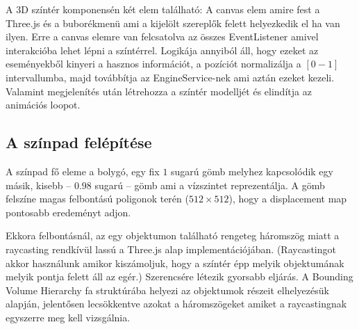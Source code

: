 A 3D színtér komponensén két elem található: A canvas elem amire fest a Three.js és a buborékmenü ami a kijelölt szereplők felett helyezkedik el ha van ilyen. Erre a canvas elemre van felcsatolva az összes EventListener amivel interakcióba lehet lépni a színtérrel. Logikája annyiból áll, hogy ezeket az eseményekből kinyeri a hasznos információt, a pozíciót normalizálja a $[0-1]$ intervallumba, majd továbbítja az EngineService-nek ami aztán ezeket kezeli. Valamint megjelenítés után létrehozza a színtér modelljét és elindítja az animációs loopot.

\subsection{A színpad felépítése}

A színpad fő eleme a bolygó, egy fix $1$ sugarú gömb melyhez kapcsolódik egy másik, kisebb -- $0.98$ sugarú -- gömb ami a vízszintet reprezentálja. A gömb felszíne magas felbontású poligonok terén ($512×512$), hogy a displacement map \cite{Displacement} pontosabb eredeményt adjon.

Ekkora felbontásnál, az egy objektumon található rengeteg háromszög miatt a raycasting \cite{Raycast} rendkívül lassú a Three.js alap implementációjában. (Raycastingot akkor használunk amikor kiszámoljuk, hogy a színtér épp melyik objektumának melyik pontja felett áll az egér.) Szerencsére létezik gyorsabb eljárás. A Bounding Volume Hierarchy \cite{BVH} fa struktúrába helyezi az objektumok részeit elhelyezésük alapján, jelentősen lecsökkentve azokat a háromszögeket amiket a raycastingnak egyszerre meg kell vizsgálnia.

